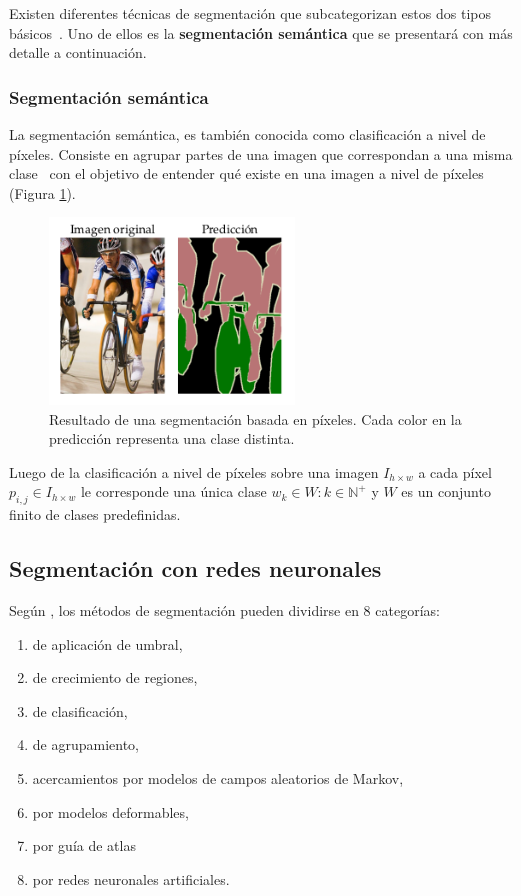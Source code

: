 Existen diferentes técnicas de segmentación que subcategorizan estos dos tipos básicos~\cite{anjna2017review}. Uno de ellos es la \textbf{segmentación semántica} que se presentará con más detalle a continuación.

\subsubsection{Segmentación semántica}

La segmentación semántica, es también conocida como clasificación a nivel de píxeles. Consiste en agrupar partes de una imagen que correspondan a una misma clase~\cite{thoma2016survey} con el objetivo de entender qué existe en una imagen a nivel de píxeles (Figura \ref{fig:semseg}).

\begin{figure}[ht]
	\centering
	\includegraphics[width=6.5cm]{./Graphics/semseg.png}
	\caption{Resultado de una segmentación basada en píxeles. Cada color en la predicción representa una clase distinta.}
	\label{fig:semseg}
\end{figure}

\begin{property}
	Luego de la clasificación a nivel de píxeles sobre una imagen $I_{h \times w}$ a cada píxel $p_{i, j} \in I_{h \times w}$ le corresponde una única clase $w_k \in W: k \in \mathbb{N}^+$ y $W$ es un conjunto finito de clases predefinidas.
\end{property}

\subsection{Segmentación con redes neuronales}\label{sec:nn}

Según \cite{pham2000survey}, los métodos de segmentación pueden dividirse en 8 categorías:
\begin{enumerate}
\item de aplicación de umbral,
\item de crecimiento de regiones,
\item de clasificación,
\item de agrupamiento,
\item acercamientos por modelos de campos aleatorios de Markov,
\item por modelos deformables,
\item por guía de atlas
\item por redes neuronales artificiales.
\end{enumerate}

